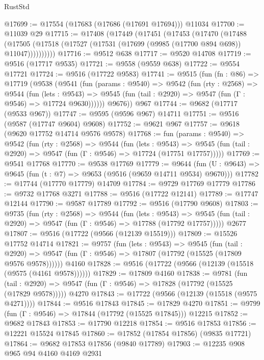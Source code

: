 \begin{lexlean}{RustStd}
\begin{coremodule}
@17699 := @17554 (@17683 (@17686 (@17691 @17694))) @11034
@17700 := @11039 @29
@17715 := @17408
    (@17449
      (@17451
        (@17453
          (@17470
            (@17488
              (@17505 (@17518 (@17527 (@17531 (@17699 (@9985 (@17700 @894 @698)) @11047))))))))))
@17716 := @9512 @638
@17717 := @9520 @14708
@17719 := @9516 (@17717 @9535)
@17721 := @9558 (@9559 @638)
@17722 := @9554 @17721
@17724 := @9516 (@17722 @9583)
@17741 := @9515
    (fun (fn : @86) =>
    @17719
      (@9538
        (@9541
          (fun (params : @9540) =>
          @9542
            (fun (rty : @2568) =>
            @9544
              (fun (lets : @9543) =>
              @9545 (fun (tail : @2920) => @9547 (fun (Γ : @9546) => @17724 @9630))))))
        @9676))
    @967
@17744 := @9682 (@17717 (@9533 @967))
@17747 := @9595 (@9596 @967) @14711
@17751 := @9516 (@9587 (@17747 @9604) @9608)
@17752 := @9621 @967
@17757 := @9618 (@9620 @17752 @14714 @9576 @9578)
@17768 := fun (params : @9540) =>
  @9542
    (fun (rty : @2568) =>
    @9544
      (fun (lets : @9543) =>
      @9545 (fun (tail : @2920) => @9547 (fun (Γ : @9546) => @17724 (@17751 @17757)))))
@17769 := @9541 @17768
@17770 := @9538 @17769
@17779 := @9644
    (fun (U : @9643) => @9645 (fun (t : @7) => @9653 (@9516 (@9659 @14711 @9534) @9670)))
@17782 := @17744 (@17770 @17779) @14709
@17784 := @9729 @17769 @17779
@17786 := @9732 @17768 @3271
@17788 := @9516 (@17722 @12141)
@17789 := @17747 @12144
@17790 := @9587 @17789
@17792 := @9516 (@17790 @9608)
@17803 := @9735
    (fun (rty : @2568) =>
    @9544
      (fun (lets : @9543) =>
      @9545 (fun (tail : @2920) => @9547 (fun (Γ : @9546) => @17788 (@17792 @17757)))))
    @2677
@17807 := @9516 (@17722 (@9566 (@12139 @15519)))
@17809 := @15526 @17752 @14714
@17821 := @9757
    (fun (lets : @9543) =>
    @9545
      (fun (tail : @2920) =>
      @9547 (fun (Γ : @9546) => @17807 (@17792 (@15525 (@17809 @9576 @9578))))))
    @4160
@17828 := @9516 (@17722 (@9566 (@12139 (@15518 (@9575 (@4161 @9578))))))
@17829 := @17809 @4160
@17838 := @9781
    (fun (tail : @2920) => @9547 (fun (Γ : @9546) => @17828 (@17792 (@15525 (@17829 @9578)))))
    @4270
@17843 := @17722 (@9566 (@12139 (@15518 (@9575 @4271))))
@17844 := @9516 @17843
@17845 := @17829 @4270
@17851 := @9799 (fun (Γ : @9546) => @17844 (@17792 (@15525 @17845))) @12215
@17852 := @9682 @17843
@17853 := @17790 @12218
@17854 := @9516 @17853
@17856 := @12221 @15524 @17845
@17860 := @17852 (@17854 @17856) (@9835 @17721)
@17864 := @9682 @17853 @17856 (@9840 @17789)
@17903 := @12235
    @908
    @965
    @94
    @4160
    @4169
    @2931

\end{coremodule}
\end{lexlean}
